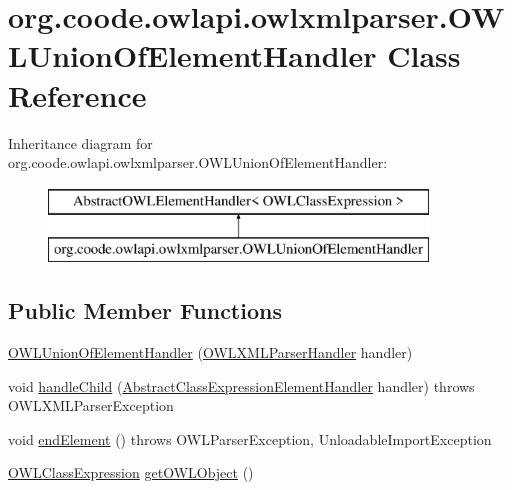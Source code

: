 \hypertarget{classorg_1_1coode_1_1owlapi_1_1owlxmlparser_1_1_o_w_l_union_of_element_handler}{\section{org.\-coode.\-owlapi.\-owlxmlparser.\-O\-W\-L\-Union\-Of\-Element\-Handler Class Reference}
\label{classorg_1_1coode_1_1owlapi_1_1owlxmlparser_1_1_o_w_l_union_of_element_handler}
}
Inheritance diagram for org.\-coode.\-owlapi.\-owlxmlparser.\-O\-W\-L\-Union\-Of\-Element\-Handler\-:\begin{figure}[H]
\begin{center}
\leavevmode
\includegraphics[height=2.000000cm]{classorg_1_1coode_1_1owlapi_1_1owlxmlparser_1_1_o_w_l_union_of_element_handler}
\end{center}
\end{figure}
\subsection*{Public Member Functions}
\begin{DoxyCompactItemize}
\item 
\hyperlink{classorg_1_1coode_1_1owlapi_1_1owlxmlparser_1_1_o_w_l_union_of_element_handler_a9af933ef0b72ebd6d2e92a4a87807805}{O\-W\-L\-Union\-Of\-Element\-Handler} (\hyperlink{classorg_1_1coode_1_1owlapi_1_1owlxmlparser_1_1_o_w_l_x_m_l_parser_handler}{O\-W\-L\-X\-M\-L\-Parser\-Handler} handler)
\item 
void \hyperlink{classorg_1_1coode_1_1owlapi_1_1owlxmlparser_1_1_o_w_l_union_of_element_handler_acb78acd83c17ddaddc6dacb3076b0d41}{handle\-Child} (\hyperlink{classorg_1_1coode_1_1owlapi_1_1owlxmlparser_1_1_abstract_class_expression_element_handler}{Abstract\-Class\-Expression\-Element\-Handler} handler)  throws O\-W\-L\-X\-M\-L\-Parser\-Exception 
\item 
void \hyperlink{classorg_1_1coode_1_1owlapi_1_1owlxmlparser_1_1_o_w_l_union_of_element_handler_a548cd5874493b009c06aa013c06e1d01}{end\-Element} ()  throws O\-W\-L\-Parser\-Exception, Unloadable\-Import\-Exception 
\item 
\hyperlink{interfaceorg_1_1semanticweb_1_1owlapi_1_1model_1_1_o_w_l_class_expression}{O\-W\-L\-Class\-Expression} \hyperlink{classorg_1_1coode_1_1owlapi_1_1owlxmlparser_1_1_o_w_l_union_of_element_handler_af906ebe5c972747d79cccef5172803e8}{get\-O\-W\-L\-Object} ()
\end{DoxyCompactItemize}


